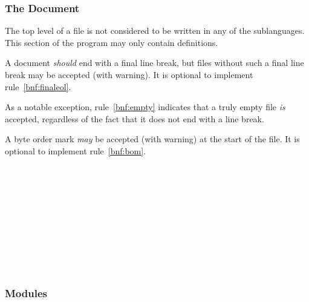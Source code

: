 \subsubsection{The Document}

The top level of a \Trilogy{} file is not considered to be written in any
of the sublanguages. This section of the program may only contain definitions.

A \Trilogy{} document \emph{should} end with a final line break,
but files without such a final line break may be accepted (with warning).
It is optional to implement rule~\ref{bnf:finaleol}.

As a notable exception, rule~\ref{bnf:empty} indicates that a truly empty
file \emph{is} accepted, regardless of the fact that it does not end with
a line break.

A byte order mark \emph{may} be accepted (with warning) at the start of
the file. It is optional to implement rule~\ref{bnf:bom}.

\begin{bnf}
     \\
     \\
     \\
     \\
     \\
     \\
     \\
     \\
     \\
\end{bnf}

\subsubsection{Modules}

